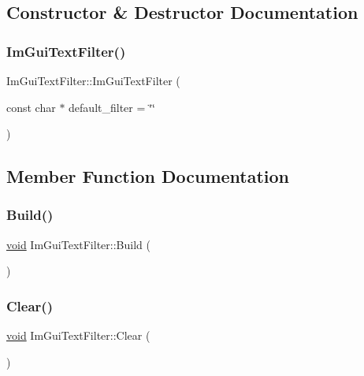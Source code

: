 \subsection{Constructor \& Destructor Documentation}
\mbox{\label{structImGuiTextFilter_a0a61ee76f0b4f3c354791734b06e3140}} 
\subsubsection{\texorpdfstring{Im\+Gui\+Text\+Filter()}{ImGuiTextFilter()}}
{\footnotesize\ttfamily Im\+Gui\+Text\+Filter\+::\+Im\+Gui\+Text\+Filter (\begin{DoxyParamCaption}\item[{const char $\ast$}]{default\+\_\+filter = {\ttfamily \char`\"{}\char`\"{}} }\end{DoxyParamCaption})}



\subsection{Member Function Documentation}
\mbox{\label{structImGuiTextFilter_aef362baafaa9dfa62d11bc6101c0f4c1}} 
\subsubsection{\texorpdfstring{Build()}{Build()}}
{\footnotesize\ttfamily \hyperlink{imgui__impl__opengl3__loader_8h_ac668e7cffd9e2e9cfee428b9b2f34fa7}{void} Im\+Gui\+Text\+Filter\+::\+Build (\begin{DoxyParamCaption}{ }\end{DoxyParamCaption})}

\mbox{\label{structImGuiTextFilter_a9043c1f0c33d29e6fc9b75ae81f9705a}} 
\subsubsection{\texorpdfstring{Clear()}{Clear()}}
{\footnotesize\ttfamily \hyperlink{imgui__impl__opengl3__loader_8h_ac668e7cffd9e2e9cfee428b9b2f34fa7}{void} Im\+Gui\+Text\+Filter\+::\+Clear (\begin{DoxyParamCaption}{ }\end{DoxyParamCaption})\hspace{0.3cm}{\ttfamily [inline]}}

